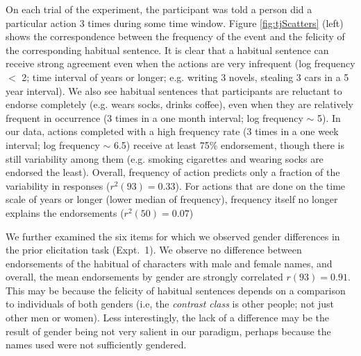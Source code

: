 \documentclass[10pt,letterpaper]{article}
\newcommand{\ndg}[1]{\textcolor{Green}{[ndg: #1]}}
\newcommand{\mht}[1]{\textcolor{DarkOrange}{[mht: #1]}}
\begin{document}
On each trial of the experiment, the participant was told a person did a particular action 3 times during some time window. 
Figure \ref{fig:tjScatters} (left) shows the correspondence between the frequency of the event and the felicity of the corresponding habitual sentence. 
It is clear that a habitual sentence can receive strong agreement even when the actions are very infrequent (log frequency $<$ 2; time interval of years or longer; e.g. writing 3 novels, stealing 3 cars in a 5 year interval).
We also see habitual sentences that participants are reluctant to endorse completely (e.g. wears socks, drinks coffee), even when they are relatively frequent in occurrence (3 times in a one month interval; log frequency $\sim$ 5).
In our data, actions completed with a high frequency rate (3 times in a one week interval; log frequency $\sim$ 6.5) receive at least 75\% endorsement, though there is still variability among them (e.g. smoking cigarettes and wearing socks are endorsed the least). %
Overall, frequency of action predicts only a fraction of the variability in responses ($r^2(93) = 0.33$).
For actions that are done on the time scale of years or longer (lower median of frequency), frequency itself no longer explains the endorsements ($r^2(50) = 0.07$)

We further examined the six items for which we observed gender differences in the prior elicitation task (Expt.~1).
We observe no difference between endorsements of the habitual of characters with male and female names, and overall, the mean endorsements by gender are strongly correlated $r(93) = 0.91$. 
This may be because the felicity of habitual sentences depends on a comparison to individuals of both genders (i.e, the \emph{contrast class} is other people; not just other men or women). 
Less interestingly, the lack of a difference may be the result of gender being not very salient in our paradigm, perhaps because the names used were not sufficiently gendered.

\end{document}
